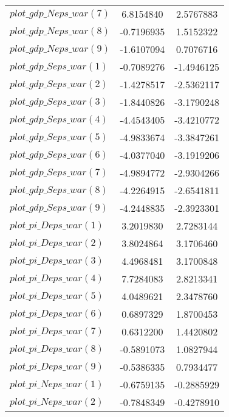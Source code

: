 \begin{center}
\begin{longtable}{lcc}
$plot\_gdp\_N eps\_war (7)  $	 & 	      6.8154840	 & 	      2.5767883 \\ 
$plot\_gdp\_N eps\_war (8)  $	 & 	     -0.7196935	 & 	      1.5152322 \\ 
$plot\_gdp\_N eps\_war (9)  $	 & 	     -1.6107094	 & 	      0.7076716 \\ 
$plot\_gdp\_S eps\_war (1)  $	 & 	     -0.7089276	 & 	     -1.4946125 \\ 
$plot\_gdp\_S eps\_war (2)  $	 & 	     -1.4278517	 & 	     -2.5362117 \\ 
$plot\_gdp\_S eps\_war (3)  $	 & 	     -1.8440826	 & 	     -3.1790248 \\ 
$plot\_gdp\_S eps\_war (4)  $	 & 	     -4.4543405	 & 	     -3.4210772 \\ 
$plot\_gdp\_S eps\_war (5)  $	 & 	     -4.9833674	 & 	     -3.3847261 \\ 
$plot\_gdp\_S eps\_war (6)  $	 & 	     -4.0377040	 & 	     -3.1919206 \\ 
$plot\_gdp\_S eps\_war (7)  $	 & 	     -4.9894772	 & 	     -2.9304266 \\ 
$plot\_gdp\_S eps\_war (8)  $	 & 	     -4.2264915	 & 	     -2.6541811 \\ 
$plot\_gdp\_S eps\_war (9)  $	 & 	     -4.2448835	 & 	     -2.3923301 \\ 
$plot\_pi\_D eps\_war (1)   $	 & 	      3.2019830	 & 	      2.7283144 \\ 
$plot\_pi\_D eps\_war (2)   $	 & 	      3.8024864	 & 	      3.1706460 \\ 
$plot\_pi\_D eps\_war (3)   $	 & 	      4.4968481	 & 	      3.1700848 \\ 
$plot\_pi\_D eps\_war (4)   $	 & 	      7.7284083	 & 	      2.8213341 \\ 
$plot\_pi\_D eps\_war (5)   $	 & 	      4.0489621	 & 	      2.3478760 \\ 
$plot\_pi\_D eps\_war (6)   $	 & 	      0.6897329	 & 	      1.8700453 \\ 
$plot\_pi\_D eps\_war (7)   $	 & 	      0.6312200	 & 	      1.4420802 \\ 
$plot\_pi\_D eps\_war (8)   $	 & 	     -0.5891073	 & 	      1.0827944 \\ 
$plot\_pi\_D eps\_war (9)   $	 & 	     -0.5386335	 & 	      0.7934477 \\ 
$plot\_pi\_N eps\_war (1)   $	 & 	     -0.6759135	 & 	     -0.2885929 \\ 
$plot\_pi\_N eps\_war (2)   $	 & 	     -0.7848349	 & 	     -0.4278910 \\ 

\end{longtable}
\end{center}
